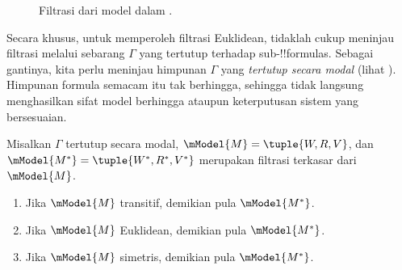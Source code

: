 \documentclass[../../../include/open-logic-section]{subfiles}
\begin{document}
\begin{figure}[ht]
  \centering
  \caption{Filtrasi dari model dalam .}
\end{figure}

Secara khusus, untuk memperoleh filtrasi Euklidean, tidaklah cukup meninjau
filtrasi melalui sebarang $\Gamma$ yang tertutup terhadap sub-!!{formula}s.
Sebagai gantinya, kita perlu meninjau himpunan $\Gamma$ yang
\emph{tertutup secara modal} (lihat
). Himpunan formula semacam itu tak berhingga,
sehingga tidak langsung menghasilkan sifat model berhingga ataupun
keterputusan sistem yang bersesuaian.

\begin{thm}
  Misalkan $\Gamma$ tertutup secara modal,
  $\mModel{M}=\tuple{W,R,V}$, dan
  $\mModel{M^*} = \tuple{W^*,R^*,V^*}$ merupakan filtrasi terkasar
  dari~$\mModel{M}$.
  \begin{enumerate}
  \item Jika $\mModel{M}$ transitif, demikian pula $\mModel{M^*}$.
  \item Jika $\mModel{M}$ Euklidean, demikian pula $\mModel{M^*}$.
  \item Jika $\mModel{M}$ simetris, demikian pula $\mModel{M^*}$.
  \end{enumerate}
\end{thm}
\end{document}
